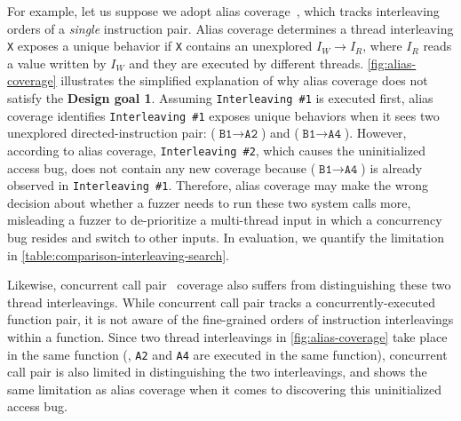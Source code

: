 For example, let us suppose we adopt alias coverage~\cite{krace},
which tracks interleaving orders of a \textit{single} instruction
pair.
%
Alias coverage determines a thread interleaving \texttt{X} exposes a
unique behavior if \texttt{X} contains an unexplored
 $I_W \rightarrow I_R$, where $I_R$
reads a value written by $I_W$ and they are executed by different
threads.  \autoref{fig:alias-coverage} illustrates the simplified
explanation of why alias coverage does not satisfy the \textbf{Design
  goal 1}.
%
Assuming \texttt{Interleaving \#1} is executed first, alias coverage
identifies \texttt{Interleaving \#1} exposes unique behaviors when it
sees two unexplored directed-instruction pair:
($\texttt{B1} \rightarrow \texttt{A2}$) and
($\texttt{B1} \rightarrow \texttt{A4}$).
%
However, according to alias coverage, \texttt{Interleaving \#2}, which
causes the uninitialized access bug, does not contain any new coverage
because ($\texttt{B1} \rightarrow \texttt{A4}$) is already observed in
\texttt{Interleaving \#1}.
%
Therefore, alias coverage may make the wrong decision about whether a
fuzzer needs to run these two system calls more, misleading a fuzzer
to de-prioritize a multi-thread input in which a concurrency bug
resides and switch to other inputs. In evaluation, we quantify the
limitation in \autoref{table:comparison-interleaving-search}.

Likewise, concurrent call pair~\cite{conzzer} coverage also suffers from
distinguishing these two thread interleavings.
%
While concurrent call pair tracks a concurrently-executed function
pair, it is not aware of the fine-grained orders of instruction interleavings within a function.
%
Since two thread interleavings in \autoref{fig:alias-coverage} take
place in the same function (\ie, \texttt{A2} and \texttt{A4} are
executed in the same function), concurrent call pair is also limited
in distinguishing the two interleavings, and shows the same limitation
as alias coverage when it comes to discovering this uninitialized
access bug.

